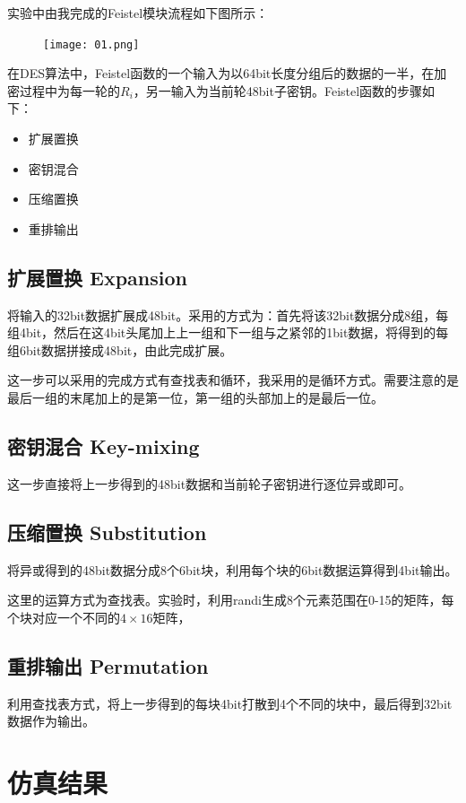 \documentclass[UTF8]{ctexart}
\begin{document}
实验中由我完成的Feistel模块流程如下图所示：
\begin{figure}[H]
    \centering
    \texttt{[image: 01.png]}
\end{figure}   

在DES算法中，Feistel函数的一个输入为以64bit长度分组后的数据的一半，在加密过程中为每一轮的$R_i$，另一输入为当前轮48bit子密钥。Feistel函数的步骤如下：

\begin{itemize}
    \item 扩展置换
    \item 密钥混合
    \item 压缩置换
    \item 重排输出
\end{itemize}

\subsection{扩展置换 Expansion}
将输入的32bit数据扩展成48bit。采用的方式为：首先将该32bit数据分成8组，每组4bit，然后在这4bit头尾加上上一组和下一组与之紧邻的1bit数据，将得到的每组6bit数据拼接成48bit，由此完成扩展。

这一步可以采用的完成方式有查找表和循环，我采用的是循环方式。需要注意的是最后一组的末尾加上的是第一位，第一组的头部加上的是最后一位。

\subsection{密钥混合 Key-mixing}
这一步直接将上一步得到的48bit数据和当前轮子密钥进行逐位异或即可。

\subsection{压缩置换 Substitution}
将异或得到的48bit数据分成8个6bit块，利用每个块的6bit数据运算得到4bit输出。

这里的运算方式为查找表。实验时，利用randi生成8个元素范围在0-15的矩阵，每个块对应一个不同的$4 \times 16$矩阵，

\subsection{重排输出 Permutation}
利用查找表方式，将上一步得到的每块4bit打散到4个不同的块中，最后得到32bit数据作为输出。

\section{仿真结果}
\end{document}
